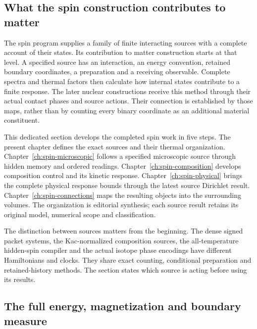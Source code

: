 \label{ch:spin-foundation}

\subsection{What the spin construction contributes to matter}

The spin program supplies a family of finite interacting sources with a complete account of their states. Its contribution to matter construction starts at that level. A specified source has an interaction, an energy convention, retained boundary coordinates, a preparation and a receiving observable. Complete spectra and thermal factors then calculate how internal states contribute to a finite response. The later nuclear constructions receive this method through their actual contact phases and source actions. Their connection is established by those maps, rather than by counting every binary coordinate as an additional material constituent.

This dedicated section develops the completed spin work in five steps. The present chapter defines the exact sources and their thermal organization. Chapter~\ref{ch:spin-microscopic} follows a specified microscopic source through hidden memory and ordered readings. Chapter~\ref{ch:spin-composition} develops composition control and its kinetic response. Chapter~\ref{ch:spin-physical} brings the complete physical response bounds through the latest source Dirichlet result. Chapter~\ref{ch:spin-connections} maps the resulting objects into the surrounding volumes. The organization is editorial synthesis; each source result retains its original model, numerical scope and classification.

The distinction between sources matters from the beginning. The dense signed packet systems, the Kac-normalized composition sources, the all-temperature hidden-spin compiler and the actual isotope phase encodings have different Hamiltonians and clocks. They share exact counting, conditional preparation and retained-history methods. The section states which source is acting before using its results.

\subsection{The full energy, magnetization and boundary measure}

